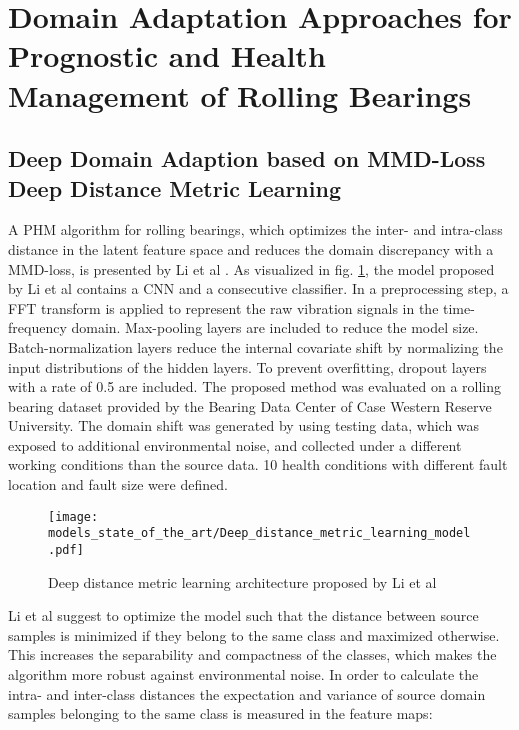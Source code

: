 \section{Domain Adaptation Approaches for Prognostic and Health Management of Rolling Bearings}



\subsection{Deep Domain Adaption based on MMD-Loss Deep Distance Metric Learning}
A PHM algorithm for rolling bearings, which optimizes the inter- and intra-class distance in the latent feature space and reduces the domain discrepancy with a MMD-loss, is presented by Li et al \cite{Li2018}. As visualized in fig. \ref{fig:Deep_distance_metric_learning_model}, the model proposed by Li et al contains a CNN and a consecutive classifier. In a preprocessing step, a FFT transform is applied to represent the raw vibration signals in the time-frequency domain. Max-pooling layers are included to reduce the model size. Batch-normalization layers reduce the internal covariate shift by normalizing the input distributions of the hidden layers. To prevent overfitting, dropout layers with a rate of 0.5 are included. The proposed method was evaluated on a rolling bearing dataset provided by the Bearing Data Center of Case Western Reserve University. The domain shift was generated by using testing data, which was exposed to additional environmental noise, and collected under a different working conditions than the source data. 10 health conditions with different fault location and fault size were defined. 

\begin{figure}[H]
  \centering
  \texttt{[image: models\_state\_of\_the\_art/Deep\_distance\_metric\_learning\_model.pdf]}
  \caption{Deep distance metric learning architecture proposed by Li et al \cite{Li2018}}
  \label{fig:Deep_distance_metric_learning_model}
\end{figure}

Li et al suggest to optimize the model such that the distance between source samples is minimized if they belong to the same class and maximized otherwise. This increases the separability and compactness of the classes, which makes the algorithm more robust against environmental noise. In order to calculate the intra- and inter-class distances the expectation and variance of source domain samples belonging to the same class is measured in the feature maps:

